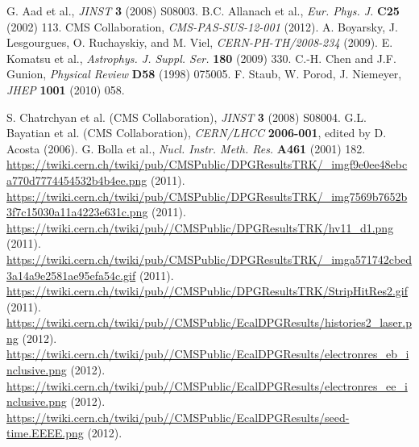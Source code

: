 \documentclass[12pt, letterpaper]{report}
\begin{document}
\begin{thebibliography}{99}
 G. Aad et al., \textit{JINST} \textbf{3} (2008) S08003.
 B.C. Allanach et al., \textit{Eur. Phys. J.} \textbf{C25} (2002) 113.
 CMS Collaboration, \textit{CMS-PAS-SUS-12-001} (2012).
 A. Boyarsky, J. Lesgourgues, O. Ruchayskiy, and M. Viel, \textit{CERN-PH-TH/2008-234} (2009).
 E. Komatsu et al., \textit{Astrophys. J. Suppl. Ser.} \textbf{180} (2009) 330.
 C.-H. Chen and J.F. Gunion, \textit{Physical Review} \textbf{D58} (1998) 075005.
 F. Staub, W. Porod, J. Niemeyer, \textit{JHEP} \textbf{1001} (2010) 058.


 S. Chatrchyan et al. (CMS Collaboration), \textit{JINST} \textbf{3} (2008) S08004.
 G.L. Bayatian et al. (CMS Collaboration), \textit{CERN/LHCC} \textbf{2006-001}, edited by D. Acosta (2006).
 G. Bolla et al., \textit{Nucl. Instr. Meth. Res.} \textbf{A461} (2001) 182.
 \url{https://twiki.cern.ch/twiki/pub/CMSPublic/DPGResultsTRK/_imgf9e0ee48ebca770d7774454532b4b4ee.png} (2011).
 \url{https://twiki.cern.ch/twiki/pub/CMSPublic/DPGResultsTRK/_img7569b7652b3f7c15030a11a4223e631c.png} (2011).
 \url{https://twiki.cern.ch/twiki/pub//CMSPublic/DPGResultsTRK/hv11_d1.png} (2011).
 \url{https://twiki.cern.ch/twiki/pub/CMSPublic/DPGResultsTRK/_imga571742cbed3a14a9e2581ae95efa54c.gif} (2011).
 \url{https://twiki.cern.ch/twiki/pub//CMSPublic/DPGResultsTRK/StripHitRes2.gif} (2011).
 \url{https://twiki.cern.ch/twiki/pub//CMSPublic/EcalDPGResults/histories2_laser.png} (2012).
 \url{https://twiki.cern.ch/twiki/pub//CMSPublic/EcalDPGResults/electronres_eb_inclusive.png} (2012).
 \url{https://twiki.cern.ch/twiki/pub//CMSPublic/EcalDPGResults/electronres_ee_inclusive.png} (2012).
 \url{https://twiki.cern.ch/twiki/pub//CMSPublic/EcalDPGResults/seed-time.EEEE.png} (2012).



\end{thebibliography}
\end{document}
